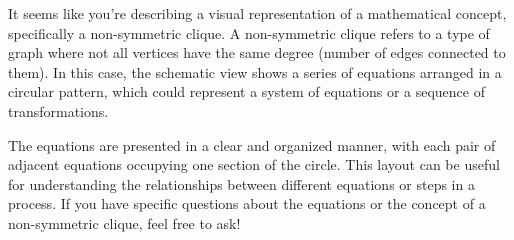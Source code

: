 It seems like you're describing a visual representation of a mathematical concept, specifically a non-symmetric clique. A non-symmetric clique refers to a type of graph where not all vertices have the same degree (number of edges connected to them). In this case, the schematic view shows a series of equations arranged in a circular pattern, which could represent a system of equations or a sequence of transformations.

The equations are presented in a clear and organized manner, with each pair of adjacent equations occupying one section of the circle. This layout can be useful for understanding the relationships between different equations or steps in a process. If you have specific questions about the equations or the concept of a non-symmetric clique, feel free to ask!